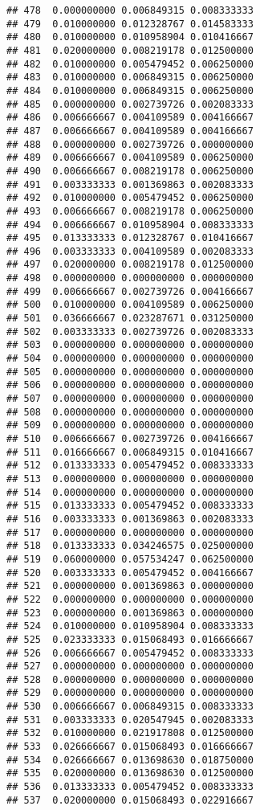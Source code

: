 \documentclass[
]{article}
\begin{document}
\begin{verbatim}
## 478  0.000000000 0.006849315 0.008333333
## 479  0.010000000 0.012328767 0.014583333
## 480  0.010000000 0.010958904 0.010416667
## 481  0.020000000 0.008219178 0.012500000
## 482  0.010000000 0.005479452 0.006250000
## 483  0.010000000 0.006849315 0.006250000
## 484  0.010000000 0.006849315 0.006250000
## 485  0.000000000 0.002739726 0.002083333
## 486  0.006666667 0.004109589 0.004166667
## 487  0.006666667 0.004109589 0.004166667
## 488  0.000000000 0.002739726 0.000000000
## 489  0.006666667 0.004109589 0.006250000
## 490  0.006666667 0.008219178 0.006250000
## 491  0.003333333 0.001369863 0.002083333
## 492  0.010000000 0.005479452 0.006250000
## 493  0.006666667 0.008219178 0.006250000
## 494  0.006666667 0.010958904 0.008333333
## 495  0.013333333 0.012328767 0.010416667
## 496  0.003333333 0.004109589 0.002083333
## 497  0.020000000 0.008219178 0.012500000
## 498  0.000000000 0.000000000 0.000000000
## 499  0.006666667 0.002739726 0.004166667
## 500  0.010000000 0.004109589 0.006250000
## 501  0.036666667 0.023287671 0.031250000
## 502  0.003333333 0.002739726 0.002083333
## 503  0.000000000 0.000000000 0.000000000
## 504  0.000000000 0.000000000 0.000000000
## 505  0.000000000 0.000000000 0.000000000
## 506  0.000000000 0.000000000 0.000000000
## 507  0.000000000 0.000000000 0.000000000
## 508  0.000000000 0.000000000 0.000000000
## 509  0.000000000 0.000000000 0.000000000
## 510  0.006666667 0.002739726 0.004166667
## 511  0.016666667 0.006849315 0.010416667
## 512  0.013333333 0.005479452 0.008333333
## 513  0.000000000 0.000000000 0.000000000
## 514  0.000000000 0.000000000 0.000000000
## 515  0.013333333 0.005479452 0.008333333
## 516  0.003333333 0.001369863 0.002083333
## 517  0.000000000 0.000000000 0.000000000
## 518  0.013333333 0.034246575 0.025000000
## 519  0.060000000 0.057534247 0.062500000
## 520  0.003333333 0.005479452 0.004166667
## 521  0.000000000 0.001369863 0.000000000
## 522  0.000000000 0.000000000 0.000000000
## 523  0.000000000 0.001369863 0.000000000
## 524  0.010000000 0.010958904 0.008333333
## 525  0.023333333 0.015068493 0.016666667
## 526  0.006666667 0.005479452 0.008333333
## 527  0.000000000 0.000000000 0.000000000
## 528  0.000000000 0.000000000 0.000000000
## 529  0.000000000 0.000000000 0.000000000
## 530  0.006666667 0.006849315 0.008333333
## 531  0.003333333 0.020547945 0.002083333
## 532  0.010000000 0.021917808 0.012500000
## 533  0.026666667 0.015068493 0.016666667
## 534  0.026666667 0.013698630 0.018750000
## 535  0.020000000 0.013698630 0.012500000
## 536  0.013333333 0.005479452 0.008333333
## 537  0.020000000 0.015068493 0.022916667

\end{verbatim}
\end{document}

